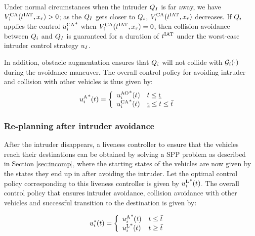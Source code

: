Under normal circumstances when the intruder $Q_{I}$ is far away, we have $V^{\text{CA}}_{i}(t^\text{IAT}, x_r) > 0$; as the $Q_{I}$ gets closer to $Q_i$, $V^{\text{CA}}_{i}(t^\text{IAT}, x_r)$ decreases. If $Q_i$ applies the control ${u^{\text{CA}}_{i}}^*$ when $V^{\text{CA}}_{i}(t^\text{IAT}, x_r) = 0$, then collision avoidance between $Q_i$ and $Q_{I}$ is guaranteed for a duration of $t^\text{IAT}$ under the worst-case intruder control strategy $u_I$.

In addition, obstacle augmentation ensures that $Q_i$ will not collide with $\mathcal{G}_i(\cdot)$ during the avoidance maneuver. %
The overall control policy for avoiding intruder and collision with other vehicles is thus given by:
\begin{equation*}
{u^{\text{A}}_{i}}^*(t) = 
\left \{ 
\begin{array}{ll}
{u^{\text{AO}}_{i}}^*(t) & t \leq \underbar{t}\\
{u^{\text{CA}}_{i}}^*(t) & \underbar{t} \leq t \leq \bar{t}
\end{array}
\right.
\end{equation*}

\subsubsection{Re-planning after intruder avoidance\label{sec:replan_method1}} 
After the intruder disappears, a liveness controller to ensure that the vehicles reach their destinations can be obtained by solving a SPP problem as described in Section \ref{sec:incomp}, where the starting states of the vehicles are now given by the states they end up in after avoiding the intruder.  
Let the optimal control policy corresponding to this liveness controller is given by ${u^{\text{L}}_{i}}^*(t)$. The overall control policy that ensures intruder avoidance, collision avoidance with other vehicles and successful transition to the destination is given by:

\begin{equation*}
u_i^*(t) = 
\left \{ 
\begin{array}{ll}
{u^{\text{A}}_{i}}^*(t) & t \leq \bar{t}\\
{u^{\text{L}}_{i}}^*(t) & t \geq \bar{t}
\end{array}
\right.
\end{equation*}

